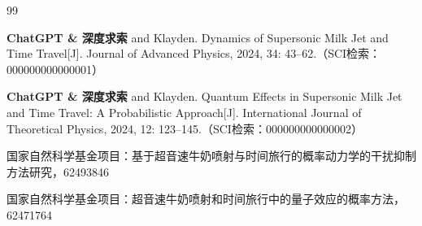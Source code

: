 \begin{publications}{99}

\item[] {\songbf{}}
\item \textbf{ChatGPT \& 深度求索} and Klayden. Dynamics of Supersonic Milk Jet and Time Travel[J]. Journal of Advanced Physics, 2024, 34: 43--62.（SCI检索：000000000000001）
\item \textbf{ChatGPT \& 深度求索} and Klayden. Quantum Effects in Supersonic Milk Jet and Time Travel: A Probabilistic Approach[J]. International Journal of Theoretical Physics, 2024, 12: 123--145.（SCI检索：000000000000002）
\vspace{1.0cm}

\item[] {\songbf{}}
\setcounter{enumiv}{0}
\item 国家自然科学基金项目：基于超音速牛奶喷射与时间旅行的概率动力学的干扰抑制方法研究，62493846
\item 国家自然科学基金项目：超音速牛奶喷射和时间旅行中的量子效应的概率方法，62471764

\end{publications}


